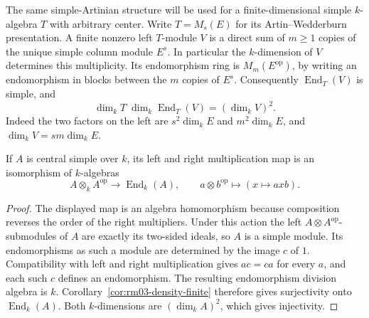 The same simple-Artinian structure will be used for a finite-dimensional
simple \(k\)-algebra \(T\) with arbitrary center. Write \(T=M_s(E)\)
for its Artin--Wedderburn presentation. A finite nonzero left
\(T\)-module \(V\) is a direct sum of \(m\geq 1\) copies of the
unique simple column module \(E^s\). In particular the
\(k\)-dimension of \(V\) determines this multiplicity. Its
endomorphism ring is \(M_m(E^{\mathrm{op}})\), by writing an
endomorphism in blocks between the \(m\) copies of \(E^s\).
Consequently \(\operatorname{End}_T(V)\) is simple, and
\begin{equation}
\label{eq:rm03-simple-end-dimension}
\dim_k T\;\dim_k\operatorname{End}_T(V)=(\dim_k V)^2.
\end{equation}
Indeed the two factors on the left are \(s^2\dim_k E\) and
\(m^2\dim_k E\), and \(\dim_k V=sm\dim_k E\).

\begin{proposition}
\label{prop:rm03-enveloping}
If \(A\) is central simple over \(k\), its left and right multiplication
map is an isomorphism of \(k\)-algebras
\[
 A\otimes_k A^{\mathrm{op}}\longrightarrow \operatorname{End}_k(A),
 \qquad a\otimes b^{\mathrm{op}}\longmapsto (x\mapsto axb).
\]
\end{proposition}
\begin{proof}
The displayed map is an algebra homomorphism because composition
reverses the order of the right multipliers. Under this action the
left \(A\otimes A^{\mathrm{op}}\)-submodules of \(A\) are exactly its
two-sided ideals, so \(A\) is a simple module. Its endomorphisms as
such a module are determined by the image \(c\) of \(1\). Compatibility
with left and right multiplication gives \(ac=ca\) for every \(a\),
and each such \(c\) defines an endomorphism. The resulting endomorphism
division algebra is \(k\). Corollary~\ref{cor:rm03-density-finite} therefore
gives surjectivity onto \(\operatorname{End}_k(A)\). Both \(k\)-dimensions
are \((\dim_k A)^2\), which gives injectivity.
\end{proof}

